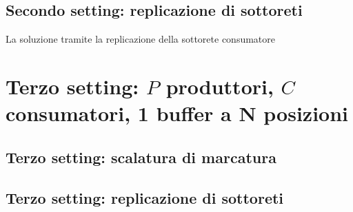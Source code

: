 \documentclass{article}
\begin{document}
\subsection{Secondo  setting: replicazione di sottoreti}\label{SEC:secondo-replica}
La soluzione tramite la replicazione della sottorete consumatore 


\section{Terzo  setting: $P$ produttori, $C$ consumatori,   1 buffer a N posizioni}\label{SEC:terzo}
\subsection{Terzo  setting: scalatura di marcatura}\label{SEC:terzo-marking}
\subsection{Terzo  setting: replicazione di sottoreti}\label{SEC:terzo-replica}
\end{document}
